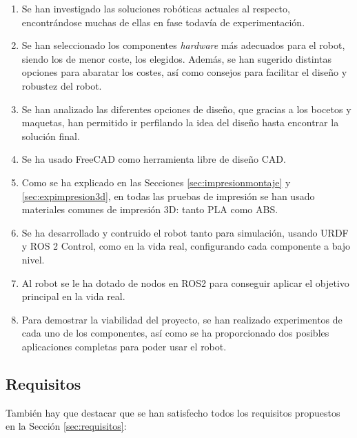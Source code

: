 \begin{enumerate}
	\item Se han investigado las soluciones robóticas actuales al respecto, encontrándose muchas de ellas en fase todavía de experimentación.
	\item Se han seleccionado los componentes \textit{hardware} más adecuados para el robot, siendo  los de menor coste, los elegidos. Además, se han sugerido distintas opciones para abaratar los costes, así como consejos para facilitar el diseño y robustez del robot. 
	\item Se han analizado las diferentes opciones de diseño, que gracias a los bocetos y maquetas, han permitido ir perfilando la idea del diseño hasta encontrar la solución final.
	\item Se ha usado FreeCAD como herramienta libre de diseño CAD.
	\item Como se ha explicado en las Secciones \ref{sec:impresionmontaje} y \ref{sec:expimpresion3d}, en todas las pruebas de impresión se han usado materiales comunes de impresión 3D: tanto PLA como ABS.
	\item Se ha desarrollado  y contruido el robot tanto para simulación, usando URDF y ROS 2 Control, como en la vida real, configurando cada componente a bajo nivel.
	\item Al robot se le ha dotado de nodos en ROS2 para conseguir aplicar el objetivo principal en la vida real.
	\item Para demostrar la viabilidad del proyecto, se han realizado experimentos de cada uno de los componentes, así como se ha proporcionado dos posibles aplicaciones completas para poder usar el robot.  
\end{enumerate}

\subsection{Requisitos}

También hay que destacar que se han satisfecho todos los requisitos propuestos en la Sección \ref{sec:requisitos}:

